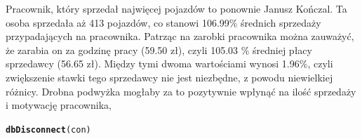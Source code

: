 \documentclass{article}\usepackage[]{graphicx}\usepackage[]{xcolor}
\makeatletter
\newcommand{\hlstd}[1]{\textcolor[rgb]{0.345,0.345,0.345}{#1}}%
\newcommand{\hlkwd}[1]{\textcolor[rgb]{0.737,0.353,0.396}{\textbf{#1}}}%
\newenvironment{kframe}{%
 \def\at@end@of@kframe{}%
 \ifinner\ifhmode%
  \def\at@end@of@kframe{\end{minipage}}%
  \begin{minipage}{\columnwidth}%
 \fi\fi%
 \def\FrameCommand##1{\hskip\@totalleftmargin \hskip-\fboxsep
 \colorbox{shadecolor}{##1}\hskip-\fboxsep
     \hskip-\linewidth \hskip-\@totalleftmargin \hskip\columnwidth}%
 \MakeFramed {\advance\hsize-\width
   \@totalleftmargin\z@ \linewidth\hsize
   \@setminipage}}%
 {\par\unskip\endMakeFramed%
 \at@end@of@kframe}
\newenvironment{knitrout}{}{} %
\makeatother
\begin{document}
Pracownik, który sprzedał najwięcej pojazdów to ponownie Janusz Kończal. Ta osoba sprzedała aż 413 pojazdów, co stanowi 106.99\% średnich sprzedaży przypadających na pracownika. Patrząc na zarobki pracownika można zauważyć, że zarabia on za godzinę pracy (59.50 zł), czyli 105.03 \% średniej płacy sprzedawcy (56.65 zł). Między tymi dwoma wartościami wynosi 1.96\%, czyli zwiększenie stawki tego sprzedawcy nie jest niezbędne, z powodu niewielkiej różnicy. Drobna podwyżka mogłaby za to pozytywnie wpłynąć na ilość sprzedaży i motywację pracownika, 


\begin{knitrout}
\color{fgcolor}\begin{kframe}
\begin{alltt}
\hlkwd{dbDisconnect}\hlstd{(con)}
\end{alltt}
\end{kframe}
\end{knitrout}
\end{document}
